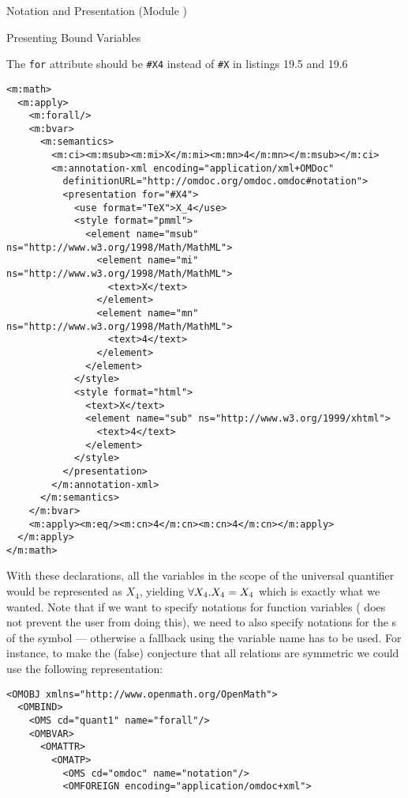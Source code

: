 \begin{tchapter}[id=pres,short=Notation and Presentation]{Notation and Presentation (Module {})}
\begin{tsection}[id=pres-bound]{Presenting Bound Variables}
\begin{erratum}[reported-by=Alberto Gonzales Palomo,date=2006-10-06]{The {\texttt{for}}
    attribute should be {\texttt{\#X4}} instead of {\texttt{\#X}} in listings 19.5 and 19.6}
\begin{lstlisting}[language=MathML,label=lst:notation-mathml,
     caption={Notation for Bound Variables in {\cmathml}},
     index={math,apply,forall,bvar,ci,csymbol}]
<m:math>
  <m:apply>  
    <m:forall/>
    <m:bvar>
      <m:semantics>
        <m:ci><m:msub><m:mi>X</m:mi><m:mn>4</m:mn></m:msub></m:ci>
        <m:annotation-xml encoding="application/xml+OMDoc"
          definitionURL="http://omdoc.org/omdoc.omdoc#notation">
          <presentation for="#X4"> 
            <use format="TeX">X_4</use>
            <style format="pmml">
              <element name="msub" ns="http://www.w3.org/1998/Math/MathML">
                <element name="mi" ns="http://www.w3.org/1998/Math/MathML">
                  <text>X</text>
                </element>
                <element name="mn" ns="http://www.w3.org/1998/Math/MathML">
                  <text>4</text>
                </element>
              </element>
            </style>
            <style format="html">
              <text>X</text>
              <element name="sub" ns="http://www.w3.org/1999/xhtml">
                <text>4</text>
              </element>
            </style>
          </presentation>
        </m:annotation-xml>
      </m:semantics>
    </m:bvar>
    <m:apply><m:eq/><m:cn>4</m:cn><m:cn>4</m:cn></m:apply>
  </m:apply>
</m:math>
\end{lstlisting}
\end{erratum}
With these declarations, all the variables in the scope of the universal quantifier
  would be represented as $X_4$, yielding ${\forall{X_4}.{X_4=X_4}}$ which is exactly what
  we wanted. Note that if we want to specify notations for function variables ({\omdoc}
  does not prevent the user from doing this), we need to also specify notations for the
  {s} of the symbol --- otherwise a fallback using the
  variable name has to be used. For instance, to make the (false) conjecture that all
  relations are symmetric we could use the following representation:
\begin{lstlisting}[language=OpenMath,label=notation-om-function,
    caption={Notation for bound variables in {\openmath}},
    index={OMOBJ,OMBIND,OMS,OMBVAR,OMV,OMATTR,OMATP}]
<OMOBJ xmlns="http://www.openmath.org/OpenMath">
  <OMBIND>                          
    <OMS cd="quant1" name="forall"/> 
    <OMBVAR>                         
      <OMATTR>                        
        <OMATP>                        
          <OMS cd="omdoc" name="notation"/>
          <OMFOREIGN encoding="application/omdoc+xml">

\end{lstlisting}
\end{tsection}
\end{tchapter}
